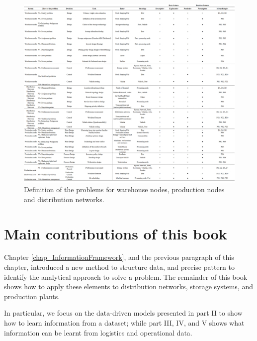 \begin{landscape}
\thispagestyle{empty}
\begin{figure}[hbt!]
\centering
\includegraphics[width=1.3\textwidth]{SectionIntroduction/dataDrivenDecisions_fig/tab_problem_classification.png}
\captionsetup{type=table}
\caption{Definition of the problems for warehouse nodes, production nodes and distribution networks.}
\label{tab_problem_classification}
\vfill
\end{figure}
\end{landscape}

\section{Main contributions of this book}
Chapter \ref{chap_InformationFramework}, and the previous paragraph of this chapter, introduced a new method to structure data, and precise pattern to identify the analytical approach to solve a problem. The remainder of this book shows how to apply these elements to distribution networks, storage systems, and production plants.\par

In particular, we focus on the data-driven models presented in part II to show how to learn information from a dataset; while part III, IV, and V shows what information can be learnt from logistics and operational data.\par

